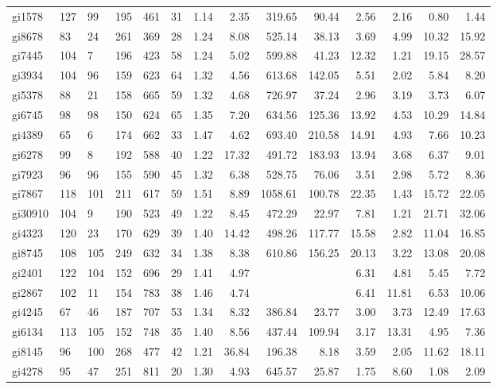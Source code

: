 {\begin{longtable}{l lllll rrrr rrrr }
gi1578 & 127 & 99 & 195 & 461 & 31 & 1.14 & 2.35 & 319.65 & 90.44 & 2.56 & 2.16 & 0.80 & 1.44 \\
gi8678 & 83 & 24 & 261 & 369 & 28 & 1.24 & 8.08 & 525.14 & 38.13 & 3.69 & 4.99 & 10.32 & 15.92 \\
gi7445 & 104 & 7 & 196 & 423 & 58 & 1.24 & 5.02 & 599.88 & 41.23 & 12.32 & 1.21 & 19.15 & 28.57 \\
gi3934 & 104 & 96 & 159 & 623 & 64 & 1.32 & 4.56 & 613.68 & 142.05 & 5.51 & 2.02 & 5.84 & 8.20 \\
gi5378 & 88 & 21 & 158 & 665 & 59 & 1.32 & 4.68 & 726.97 & 37.24 & 2.96 & 3.19 & 3.73 & 6.07 \\
gi6745 & 98 & 98 & 150 & 624 & 65 & 1.35 & 7.20 & 634.56 & 125.36 & 13.92 & 4.53 & 10.29 & 14.84 \\
gi4389 & 65 & 6 & 174 & 662 & 33 & 1.47 & 4.62 & 693.40 & 210.58 & 14.91 & 4.93 & 7.66 & 10.23 \\
gi6278 & 99 & 8 & 192 & 588 & 40 & 1.22 & 17.32 & 491.72 & 183.93 & 13.94 & 3.68 & 6.37 & 9.01 \\
gi7923 & 96 & 96 & 155 & 590 & 45 & 1.32 & 6.38 & 528.75 & 76.06 & 3.51 & 2.98 & 5.72 & 8.36 \\
gi7867 & 118 & 101 & 211 & 617 & 59 & 1.51 & 8.89 & 1058.61 & 100.78 & 22.35 & 1.43 & 15.72 & 22.05 \\
gi30910 & 104 & 9 & 190 & 523 & 49 & 1.22 & 8.45 & 472.29 & 22.97 & 7.81 & 1.21 & 21.71 & 32.06 \\
gi4323 & 120 & 23 & 170 & 629 & 39 & 1.40 & 14.42 & 498.26 & 117.77 & 15.58 & 2.82 & 11.04 & 16.85 \\
gi8745 & 108 & 105 & 249 & 632 & 34 & 1.38 & 8.38 & 610.86 & 156.25 & 20.13 & 3.22 & 13.08 & 20.08 \\
gi2401 & 122 & 104 & 152 & 696 & 29 & 1.41 & 4.97 &  &  & 6.31 & 4.81 & 5.45 & 7.72 \\
gi2867 & 102 & 11 & 154 & 783 & 38 & 1.46 & 4.74 &  &  & 6.41 & 11.81 & 6.53 & 10.06 \\
gi4245 & 67 & 46 & 187 & 707 & 53 & 1.34 & 8.32 & 386.84 & 23.77 & 3.00 & 3.73 & 12.49 & 17.63 \\
gi6134 & 113 & 105 & 152 & 748 & 35 & 1.40 & 8.56 & 437.44 & 109.94 & 3.17 & 13.31 & 4.95 & 7.36 \\
gi8145 & 96 & 100 & 268 & 477 & 42 & 1.21 & 36.84 & 196.38 & 8.18 & 3.59 & 2.05 & 11.62 & 18.11 \\
gi4278 & 95 & 47 & 251 & 811 & 20 & 1.30 & 4.93 & 645.57 & 25.87 & 1.75 & 8.60 & 1.08 & 2.09 \\

\end{longtable}}
